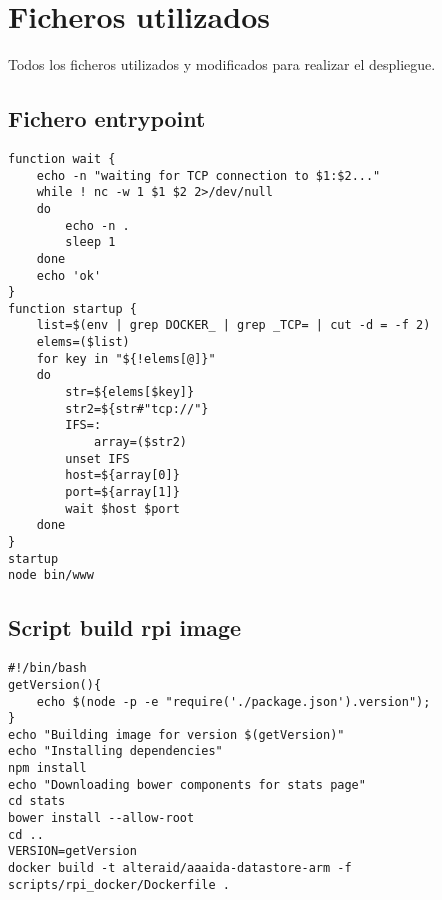 \chapter{Ficheros utilizados}

Todos los ficheros utilizados y modificados para realizar el despliegue. 

\section{Fichero entrypoint}
\begin{lstlisting}[style=Bash]
function wait {
    echo -n "waiting for TCP connection to $1:$2..."
    while ! nc -w 1 $1 $2 2>/dev/null
    do
        echo -n .
        sleep 1
    done
    echo 'ok'
}
function startup {
    list=$(env | grep DOCKER_ | grep _TCP= | cut -d = -f 2)
    elems=($list)
    for key in "${!elems[@]}"
    do
        str=${elems[$key]}
        str2=${str#"tcp://"}
        IFS=:
            array=($str2)
        unset IFS
        host=${array[0]}
        port=${array[1]}
        wait $host $port
    done
}
startup
node bin/www
\end{lstlisting}

\section{Script build rpi image}
\begin{lstlisting}[style=Bash]
#!/bin/bash
getVersion(){
    echo $(node -p -e "require('./package.json').version");
}
echo "Building image for version $(getVersion)"
echo "Installing dependencies"
npm install
echo "Downloading bower components for stats page"
cd stats
bower install --allow-root
cd ..
VERSION=getVersion
docker build -t alteraid/aaaida-datastore-arm -f scripts/rpi_docker/Dockerfile .
\end{lstlisting}

